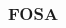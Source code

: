 \subsection{}
\begin{frame}
    \frametitle{ \hfill{} \footnotesize{FOSA}}
    \framesubtitle{}
    \begin{columns}
        \begin{column}{5cm}
        \end{column}
        \begin{column}{5cm}
        \end{column}
    \end{columns}
\end{frame}

